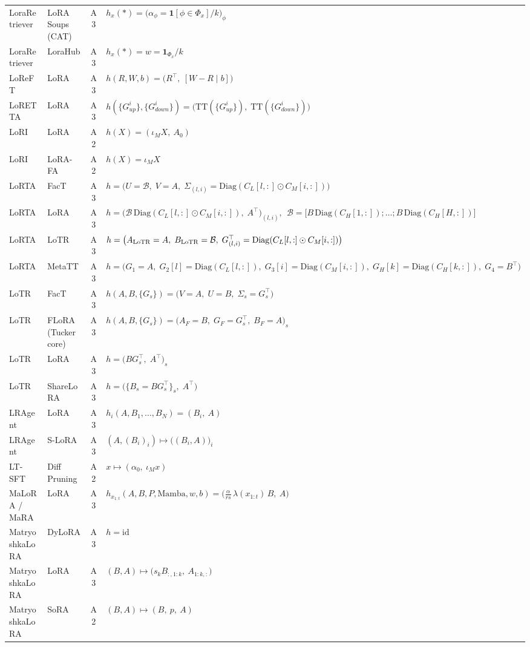 \begin{longtable}{@{}>{\raggedright\arraybackslash}p{2.4cm}>{\raggedright\arraybackslash}p{2.4cm}c>{\raggedright\arraybackslash}p{8.6cm}@{}}
LoraRetriever & LoRA Soups (CAT) & A3 & $h_x(\ast)=\big(\alpha_\phi=\mathbf 1[\phi\in\Phi_x]/k\big)_\phi$\\
LoraRetriever & LoraHub & A3 & $h_x(\ast)=w=\mathbf 1_{\Phi_x}/k$\\
LoReFT & LoRA & A3 & $h(R,W,b)=\big(R^\top,\ [W-R\mid b]\big)$\\
LoRETTA & LoRA & A3 & $h(\{G^i_{up}\},\{G^i_{down}\})=\big(\mathrm{TT}(\{G^i_{up}\}),\;\mathrm{TT}(\{G^i_{down}\})\big)$\\
LoRI & LoRA & A2 & $h(X)=(\iota_M X,\ A_0)$\\
LoRI & LoRA-FA & A2 & $h(X)=\iota_M X$\\
LoRTA & FacT & A3 & $h=\big(U=\mathcal B,\;V=A,\;\Sigma_{(l,i)}=\mathrm{Diag}(C_L[l,:]\odot C_M[i,:])\big)$\\
LoRTA & LoRA & A3 & $h=\big(\mathcal B\,\mathrm{Diag}(C_L[l,:]\odot C_M[i,:]),\;A^\top\big)_{(l,i)},\ \ \mathcal B=\big[B\,\mathrm{Diag}(C_H[1,:]);\dots;B\,\mathrm{Diag}(C_H[H,:])\big]$\\
LoRTA & LoTR & A3 & $h=\big(A_{\rm LoTR}=A,\;B_{\rm LoTR}=\mathcal B,\;G_{(l,i)}^\top=\mathrm{Diag}(C_L[l,:]\odot C_M[i,:])\big)$\\
LoRTA & MetaTT & A3 & $h=\big(G_1=A,\;G_2[l]=\mathrm{Diag}(C_L[l,:]),\;G_3[i]=\mathrm{Diag}(C_M[i,:]),\;G_H[k]=\mathrm{Diag}(C_H[k,:]),\;G_4=B^\top\big)$\\
LoTR & FacT & A3 & $h(A,B,\{G_s\})=\big(V=A,\;U=B,\;\Sigma_s=G_s^\top\big)$\\
LoTR & FLoRA (Tucker core) & A3 & $h(A,B,\{G_s\})=\big(A_F=B,\;G_F=G_s^\top,\;B_F=A\big)_s$\\
LoTR & LoRA & A3 & $h=\big(BG_s^\top,\;A^\top\big)_s$\\
LoTR & ShareLoRA & A3 & $h=\big(\{B_s=BG_s^\top\}_s,\;A^\top\big)$\\
LRAgent & LoRA & A3 & $h_i(A,B_1,\dots,B_N)=(B_i,\ A)$\\
LRAgent & S-LoRA & A3 & $(A,(B_i)_i)\mapsto\big((B_i,A)\big)_i$\\
LT-SFT & Diff Pruning & A2 & $x\mapsto(\alpha_0,\ \iota_M x)$\\
MaLoRA / MaRA & LoRA & A3 & $h_{x_{1:t}}(A,B,P,\mathrm{Mamba},w,b)=\big(\tfrac{\alpha}{rs}\,\lambda(x_{1:t})\,B,\ A\big)$\\
MatryoshkaLoRA & DyLoRA & A3 & $h=\mathrm{id}$\\
MatryoshkaLoRA & LoRA & A3 & $(B,A)\mapsto\big(s_kB_{:,1:k},\ A_{1:k,:}\big)$\\
MatryoshkaLoRA & SoRA & A2 & $(B,A)\mapsto(B,\ p,\ A)$\\

\end{longtable}
